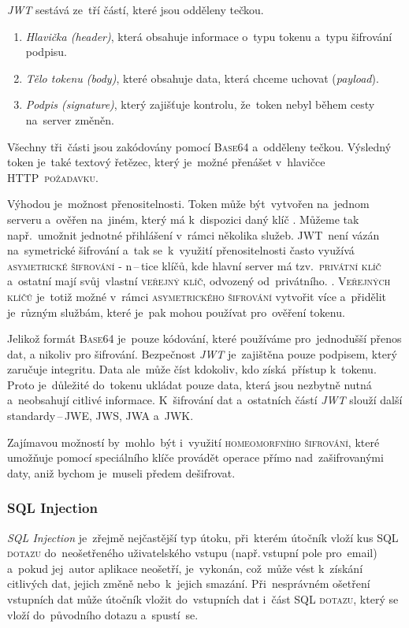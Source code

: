 \documentclass[14pt,a4paper]{article}
\begin{document}
            \emph{JWT} sestává ze~tří částí, které jsou odděleny tečkou.
            
            \begin{enumerate}
                \item \emph{Hlavička (header)}, která obsahuje informace o~typu tokenu a~typu šifrování podpisu.
                \item \emph{Tělo tokenu (body)}, které obsahuje data, která chceme uchovat (\emph{payload}).
                \item \emph{Podpis (signature)}, který zajišťuje kontrolu, že~token nebyl během cesty na~server změněn.
            \end{enumerate}

            Všechny tři~části jsou zakódovány pomocí \textsc{Base64} a~odděleny tečkou. Výsledný token je~také textový řetězec, který je~možné přenášet v~hlavičce \textsc{HTTP~požadavku}.

            Výhodou je~možnost přenositelnosti. Token může být~vytvořen na~jednom serveru a~ověřen na~jiném, který má k~dispozici daný klíč \cite{ieee:jwt}. Můžeme tak např.~umožnit jednotné přihlášení v~rámci několika služeb. JWT~není vázán na~symetrické šifrování a~tak se~k~využití přenositelnosti často využívá \textsc{asymetrické šifrování} - n\,--\,tice klíčů, kde hlavní server má tzv.~\textsc{privátní klíč} a~ostatní mají svůj~vlastní \textsc{veřejný klíč}, odvozený od~privátního. \cite{miguelgrinbergJSONTokens}. \textsc{Veřejných klíčů} je~totiž možné v~rámci \textsc{asymetrického šifrování} vytvořit více a~přidělit je~různým službám, které je~pak mohou používat pro~ověření tokenu.

            Jelikož formát \textsc{Base64} je~pouze kódování, které používáme pro~jednodušší přenos dat, a nikoliv pro šifrování. Bezpečnost \emph{JWT} je~zajištěna pouze podpisem, který zaručuje integritu. Data ale~může číst kdokoliv, kdo získá~přístup k~tokenu. Proto je~důležité do~tokenu ukládat pouze data, která jsou nezbytně nutná a~neobsahují citlivé informace. K~šifrování dat a~ostatních částí \emph{JWT} slouží další standardy\,--\,\textsc{JWE}, \textsc{JWS}, \textsc{JWA} a~\textsc{JWK}. \cite{jwtesak}

            Zajímavou možností by~mohlo~být i~využití \textsc{homeomorfního šifrování}, které umožňuje pomocí speciálního klíče provádět operace přímo nad~zašifrovanými daty, aniž bychom je~museli předem dešifrovat. \cite{homeomorphicEncryption}

            \subsubsection{SQL Injection}
            \emph{SQL Injection} je~zřejmě nejčastější typ útoku, při~kterém útočník vloží kus \textsc{SQL dotazu} do~neošetřeného uživatelského vstupu (např.\,vstupní pole pro~email) a~pokud jej~autor aplikace neošetří, je~vykonán, což~může vést k~získání citlivých dat, jejich změně nebo~k~jejich smazání.
            Při~nesprávném ošetření vstupních dat může útočník vložit do~vstupních dat i~část \textsc{SQL dotazu}, který se vloží do~původního dotazu a~spustí~se.
\end{document}
